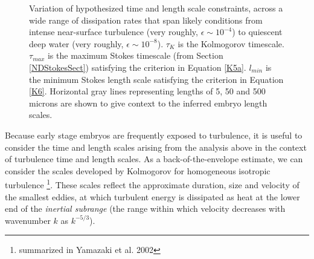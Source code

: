 \documentclass[10pt,a4paper]{article}
\def\l{\mathit{l}}
\begin{document}
\begin{figure}[t] 
	\begin{center}
	\end{center}
	\caption{Variation of hypothesized time and length scale constraints, across a wide range of dissipation rates that span likely conditions from intense near-surface turbulence (very roughly, $\epsilon \sim 10^{-4}$) to quiescent deep water (very roughly, $\epsilon \sim 10^{-8}$). $\tau_K$ is the Kolmogorov timescale. $\tau_{max}$ is the maximum Stokes timescale (from Section \ref{NDStokesSect}) satisfying the criterion in Equation \ref{K5a}. $\l_{min}$ is the minimum Stokes length scale satisfying the criterion in Equation \ref{K6}. Horizontal gray lines representing lengths of 5, 50 and 500 microns are shown to give context to the inferred embryo length scales. 
	} \label{fig:Kol}
\end{figure}

Because early stage embryos are frequently exposed to turbulence, it is useful to consider the time and length scales arising from the analysis above in the context of turbulence time and length scales.
As a back-of-the-envelope estimate, we can consider the scales developed by Kolmogorov for homogeneous isotropic turbulence \footnote{summarized in Yamazaki et al. 2002}.
These scales reflect the approximate duration, size and velocity of the smallest eddies, at which turbulent energy is dissipated as heat at the lower end of the \textit{inertial subrange} (the range within which velocity decreases with wavenumber $k$ as $k^{-5/3}$).
\end{document}
